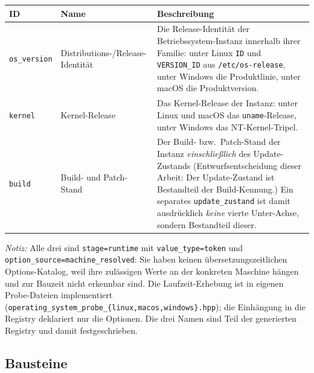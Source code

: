 \begin{scriptsize}
\begin{longtable}{@{}>{\raggedright\arraybackslash}p{1.8cm} >{\raggedright\arraybackslash}p{3.2cm} >{\raggedright\arraybackslash}p{8.5cm}@{}}
\toprule
ID & Name & Beschreibung \\
\midrule
\endhead%
\texttt{os\_\allowbreak{}version} & Distributions-/\allowbreak{}Release-Identität & Die Release-Identität der Betriebssystem-Instanz innerhalb ihrer Familie: unter Linux \texttt{ID} und \texttt{VERSION\_\allowbreak{}ID} aus \texttt{/etc/\allowbreak{}os-release}, unter Windows die Produktlinie, unter macOS die Produktversion. \\
\texttt{kernel} & Kernel-Release & Das Kernel-Release der Instanz: unter Linux und macOS das \texttt{uname}-Release, unter Windows das NT-Kernel-Tripel. \\
\texttt{build} & Build- und Patch-Stand & Der Build- bzw.\ Patch-Stand der Instanz \emph{einschließlich} des Update-Zustands (Entwurfsentscheidung dieser Arbeit: Der Update-Zustand ist Bestandteil der Build-Kennung.) Ein separates \texttt{update\_\allowbreak{}zustand} ist damit ausdrücklich \emph{keine} vierte Unter-Achse, sondern Bestandteil dieser. \\
\bottomrule
\end{longtable}
\end{scriptsize}

\emph{Notiz:} Alle drei sind \texttt{stage=\allowbreak{}runtime} mit \texttt{value\_\allowbreak{}type=\allowbreak{}token} und \texttt{option\_\allowbreak{}source=\allowbreak{}machine\_\allowbreak{}resolved}: Sie haben keinen übersetzungszeitlichen Options-Katalog, weil ihre zulässigen Werte an der konkreten Maschine hängen und zur Bauzeit nicht erkennbar sind. Die Laufzeit-Erhebung ist in eigenen Probe-Dateien implementiert (\texttt{operating\_\allowbreak{}system\_\allowbreak{}probe\_\allowbreak{}\{linux,\allowbreak{}macos,\allowbreak{}windows\}.hpp}); die Einhängung in die Registry deklariert nur die Optionen. Die drei Namen sind Teil der generierten Registry und damit festgeschrieben.

\subsection*{Bausteine}


